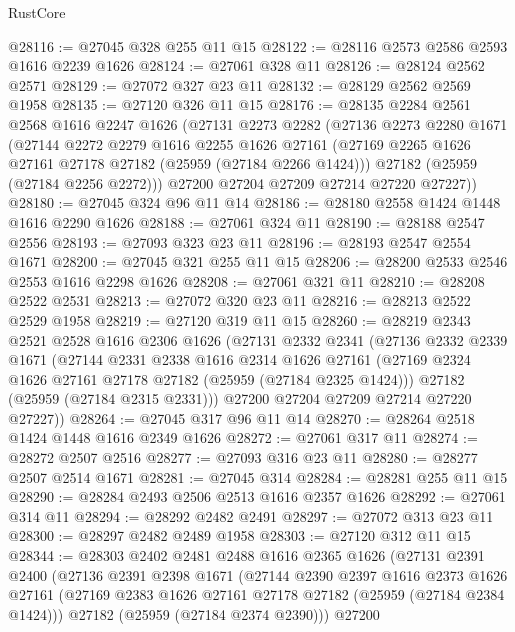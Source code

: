 \begin{lexlean}{RustCore}
\begin{coremodule}
@28116 := @27045 @328 @255 @11 @15
@28122 := @28116 @2573 @2586 @2593 @1616 @2239 @1626
@28124 := @27061 @328 @11
@28126 := @28124 @2562 @2571
@28129 := @27072 @327 @23 @11
@28132 := @28129 @2562 @2569 @1958
@28135 := @27120 @326 @11 @15
@28176 := @28135
    @2284
    @2561
    @2568
    @1616
    @2247
    @1626
    (@27131
      @2273
      @2282
      (@27136
        @2273
        @2280
        @1671
        (@27144
          @2272
          @2279
          @1616
          @2255
          @1626
          @27161
          (@27169 @2265 @1626 @27161 @27178 @27182 (@25959 (@27184 @2266 @1424)))
          @27182
          (@25959 (@27184 @2256 @2272)))
        @27200
        @27204
        @27209
        @27214
        @27220
        @27227))
@28180 := @27045 @324 @96 @11 @14
@28186 := @28180 @2558 @1424 @1448 @1616 @2290 @1626
@28188 := @27061 @324 @11
@28190 := @28188 @2547 @2556
@28193 := @27093 @323 @23 @11
@28196 := @28193 @2547 @2554 @1671
@28200 := @27045 @321 @255 @11 @15
@28206 := @28200 @2533 @2546 @2553 @1616 @2298 @1626
@28208 := @27061 @321 @11
@28210 := @28208 @2522 @2531
@28213 := @27072 @320 @23 @11
@28216 := @28213 @2522 @2529 @1958
@28219 := @27120 @319 @11 @15
@28260 := @28219
    @2343
    @2521
    @2528
    @1616
    @2306
    @1626
    (@27131
      @2332
      @2341
      (@27136
        @2332
        @2339
        @1671
        (@27144
          @2331
          @2338
          @1616
          @2314
          @1626
          @27161
          (@27169 @2324 @1626 @27161 @27178 @27182 (@25959 (@27184 @2325 @1424)))
          @27182
          (@25959 (@27184 @2315 @2331)))
        @27200
        @27204
        @27209
        @27214
        @27220
        @27227))
@28264 := @27045 @317 @96 @11 @14
@28270 := @28264 @2518 @1424 @1448 @1616 @2349 @1626
@28272 := @27061 @317 @11
@28274 := @28272 @2507 @2516
@28277 := @27093 @316 @23 @11
@28280 := @28277 @2507 @2514 @1671
@28281 := @27045 @314
@28284 := @28281 @255 @11 @15
@28290 := @28284 @2493 @2506 @2513 @1616 @2357 @1626
@28292 := @27061 @314 @11
@28294 := @28292 @2482 @2491
@28297 := @27072 @313 @23 @11
@28300 := @28297 @2482 @2489 @1958
@28303 := @27120 @312 @11 @15
@28344 := @28303
    @2402
    @2481
    @2488
    @1616
    @2365
    @1626
    (@27131
      @2391
      @2400
      (@27136
        @2391
        @2398
        @1671
        (@27144
          @2390
          @2397
          @1616
          @2373
          @1626
          @27161
          (@27169 @2383 @1626 @27161 @27178 @27182 (@25959 (@27184 @2384 @1424)))
          @27182
          (@25959 (@27184 @2374 @2390)))
        @27200

\end{coremodule}
\end{lexlean}
